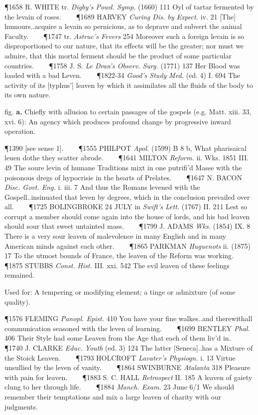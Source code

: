 \begin{description}[wide, labelwidth=!, labelindent=0pt]
\begin{myenumerate}
\P 1658 R. WHITE tr.  \textit{Digby's Powd. Symp.} (1660) 111 Oyl of tartar fermented by the levain of roses.    
\P 1689 HARVEY  \textit{Curing Dis. by Expect.} iv. 21 [The] humours..acquire a levain so pernicious, as to deprave and subvert the animal Faculty.    
\P 1747 tr.  \textit{Astruc's Fevers} 254 Moreover such a foreign levain is so disproportioned to our nature, that its effects will be the greater; nor must we admire, that this mortal ferment should be the product of some particular countries.    
\P 1758 J. S. \textit{Le Dran's Observ. Surg.} (1771) 137 Her Blood was loaded with a bad Leven.    
\P 1822-34 \textit{Good's  Study Med.} (ed. 4) I. 694 The activity of its [typhus'] leaven by which it assimilates all the fluids of the body to its own nature.

 fig. \textbf{a.} Chiefly with allusion to certain passages of the gospels (e.g. Matt. xiii. 33, xvi. 6): An agency which produces profound change by progressive inward operation.

\P 1390 [see sense 1].    
\P 1555 PHILPOT  \textit{Apol.} (1599) B 8 b, What pharisaical leuen dothe they scatter abrode.    
\P 1641 MILTON  \textit{Reform.} ii. Wks. 1851 III. 49 The soure levin of humane Traditions mixt in one putrifi'd Masse with the poisonous dregs of hypocrisie in the hearts of Prelates.    
\P 1647 N. BACON  \textit{Disc. Govt. Eng.} i. iii. 7 And thus the Romans levened with the Gospell..insinuated that leven by degrees, which in the conclusion prevailed over all.    
\P 1725 BOLINGBROKE 24 JULY in  \textit{Swift's Lett.} (1767) II. 211 Lest so corrupt a member should come again into the house of lords, and his bad leaven should sour that sweet untainted mass.    
\P 1799 J. ADAMS  \textit{Wks.} (1854) IX. 8 There is a very sour leaven of malevolence in many English and in many American minds against each other.    
\P 1865 PARKMAN  \textit{Huguenots} ii. (1875) 17 To the utmost bounds of France, the leaven of the Reform was working.    
\P 1875 STUBBS  \textit{Const. Hist.} III. xxi. 542 The evil leaven of these feelings remained.

 Used for: A tempering or modifying element; a tinge or admixture (of some quality).

\P 1576 FLEMING  \textit{Panopl. Epist.} 410 You have your fine walkes..and therewithall communication seasoned with the leven of learning.    
\P 1699 BENTLEY  \textit{Phal.} 406 Their Style had some Leaven from the Age that each of them liv'd in.    
\P 1740 J. CLARKE  \textit{Educ. Youth} (ed. 3) 124 The latter [Seneca]..has a Mixture of the Stoick Leaven.    
\P 1793 HOLCROFT  \textit{Lavater's Physiogn.} i. 13 Virtue unsullied by the leven of vanity.    
\P 1864 SWINBURNE  \textit{Atalanta} 318 Pleasure with pain for leaven.    
\P 1883 S. C. HALL  \textit{Retrospect} II. 185 A leaven of gaiety clung to her through life.    
\P 1884  \textit{Manch. Exam.} 23 June 6/1 We should remember their temptations and mix a large leaven of charity with our judgments.


\end{myenumerate}
\end{description}

